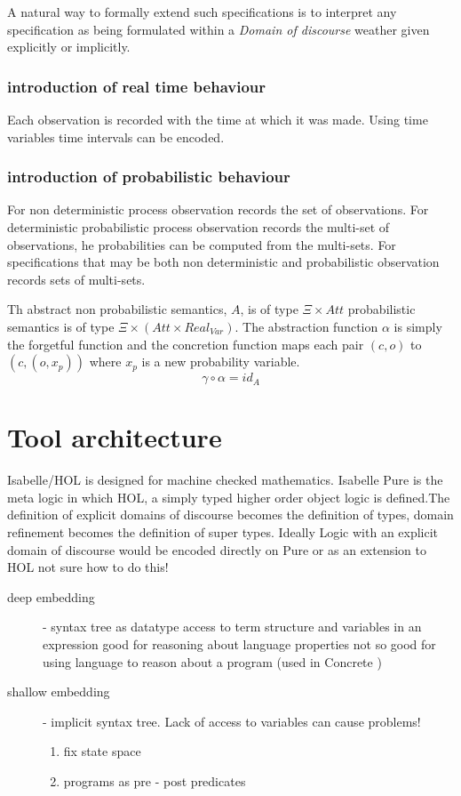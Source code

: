 A natural way to formally extend such specifications is to interpret any specification as being formulated  within  a \emph{Domain of discourse} weather given explicitly or implicitly.





\subsubsection{introduction of real time behaviour}
 Each observation is recorded with the time at which it was made.  Using time variables time intervals can be encoded.
 
 
\subsubsection{introduction of probabilistic behaviour}  For non deterministic  process observation records the set of observations.  For deterministic probabilistic process observation records the multi-set of observations, he probabilities can be computed from the multi-sets. For specifications that may be both non deterministic and probabilistic observation records sets of multi-sets.  

Th abstract non probabilistic semantics, $A$,  is of type $\Xi \times Att$ probabilistic semantics is of type  $\Xi \times (Att\times Real_{Var})$. The abstraction function $\alpha$ is simply the forgetful function and the concretion function maps each pair $(c,o)$ to $(c,(o,x_p))$ where $x_p$ is a new probability variable.
\[ \gamma\circ\alpha = id_A\]


\section{Tool architecture }

Isabelle/HOL is designed for machine checked mathematics.  Isabelle Pure is the meta logic in which  HOL, a simply typed higher order object logic is defined.The definition of explicit domains of discourse becomes the definition of types, domain refinement becomes the definition of super types.  Ideally Logic with an  explicit domain of discourse would be encoded  directly on Pure or as an extension to HOL not sure how to do this!

 \begin{description}
 \item [deep embedding] - syntax tree as datatype access to term structure and variables in an expression good for reasoning about language properties not so good  for using language to reason about a program (used in Concrete )
 \item [shallow embedding] - implicit syntax tree.  Lack of  access to variables can cause problems!
 \begin{enumerate}
 \item fix state space
 \item programs as pre - post predicates 
 \end{enumerate}
 \end{description}
 
